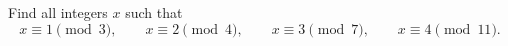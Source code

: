 Find all integers $x$ such that
\[x\equiv1\pmod3,\qquad x\equiv2\pmod4,\qquad x\equiv3\pmod7,\qquad x\equiv4\pmod{11}.\]
